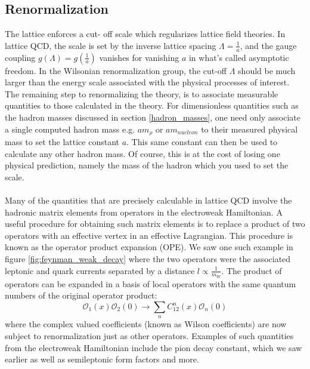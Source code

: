 \documentclass[a4paper,10pt]{book}
\begin{document}
\subsection{Renormalization}\label{Renormalization}
The lattice enforces a cut- off scale which regularizes lattice field theories. In lattice QCD, the scale is set by the inverse lattice spacing $\Lambda = \frac{1}{a}$, and the gauge coupling $g(\Lambda) = g\left( \frac{1}{a} \right)$ vanishes for vanishing $a$ in what's called asymptotic freedom. In the Wilsonian renormalization group, the cut-off $\Lambda$ should be much larger than the energy scale associated with the physical processes of interest. The remaining step to renormalizing the theory, is to associate measurable quantities to those calculated in the theory. For dimensionless quantities such as the hadron masses discussed in section \ref{hadron_masses}, one need only associate a single computed hadron mass e.g. $am_\rho$ or $am_{nucleon}$ to their measured physical mass to set the lattice constant $a$. This same constant can then be used to calculate any other hadron mass. Of course, this is at the cost of losing one physical prediction, namely the mass of the hadron which you used to set the scale.\\\\Many of the quantities that are precisely calculable in lattice QCD involve the hadronic matrix elements from operators in the electroweak Hamiltonian. A useful procedure for obtaining such matrix elements is to replace a product of two operators with an effective vertex in an effective Lagrangian. This procedure is known as the operator product expansion (OPE). We saw one such example in figure \ref{fig:feynman_weak_decay} where the two operators were the associated leptonic and quark currents separated by a distance $l \propto \frac{1}{m_W}$. The product of operators can be expanded in a basis of local operators with the same quantum numbers of the original operator product:
\begin{equation}
\mathcal{O}_{1}(x) \mathcal{O}_{2}(0) \rightarrow \sum_{n} C_{12}^{n}(x) \mathcal{O}_{n}(0)
\end{equation}
where the complex valued coefficients (known as Wilson coefficients) are now subject to renormalization just as other operators. Examples of such quantities from the electroweak Hamiltonian include the pion decay constant, which we saw earlier as well as semileptonic form factors and more.
\end{document}
